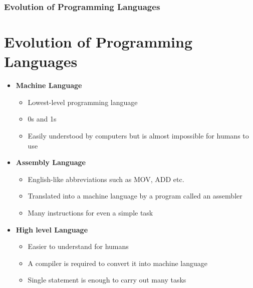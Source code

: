 \documentclass{beamer}
\begin{document}
\begin{frame}
    \frametitle{Evolution of Programming Languages}
    \section{Evolution of Programming Languages} %
    \label{sec:evolution_of_programming_languages}
    \begin{itemize}
        \item \textbf{Machine Language}
            \begin{itemize}
                \item Lowest-level programming language
                \item 0s and 1s
                \item Easily understood by computers but is almost impossible for humans to use
            \end{itemize}
        \item \textbf{Assembly Language}
            \begin{itemize}
                \item English-like abbreviations such as MOV, ADD etc.
                \item Translated into a machine language by a program called an assembler
                \item Many instructions for even a simple task
            \end{itemize}
        \item \textbf{High level Language}
            \begin{itemize}
                \item Easier to understand for humans
                \item A compiler is required to convert it into machine language
                \item Single statement is enough to carry out many tasks
            \end{itemize}
    \end{itemize}
\end{frame}
\end{document}
